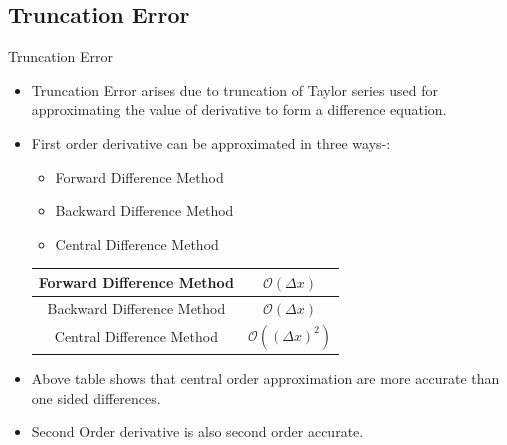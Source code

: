 \documentclass{beamer}
\newcommand{\mcm}[1]{\mathcal{#1}}
\begin{document}
		\subsection{Truncation Error}
		\begin{frame}{Truncation Error}
			\begin{itemize}
				\item Truncation Error arises due to truncation of Taylor series used for approximating the value of derivative to form a difference equation.
				\item First order derivative can be approximated in three ways-:
					\begin{itemize}
						\item Forward Difference Method
						\item Backward Difference Method
						\item Central Difference Method \\
						\medskip
					\end{itemize}
				
						\begin{center}
							
							\begin{tabular}{ || c| c || } 
								\hline 
								Forward Difference Method &  $ \mcm{O}(\Delta x)$ \\ 
								\hline 
								Backward Difference Method &$ \mcm{O}(\Delta x)$  \\ 
								\hline 
								Central Difference Method &  $ \mcm{O}((\Delta x)^2) $ \\ 
								\hline 
							\end{tabular}
						\end{center}
						\item Above table shows that central order approximation are more accurate than one sided differences.
						\item Second Order derivative is also second order accurate.
				
			\end{itemize}
		\end{frame}
\end{document}
